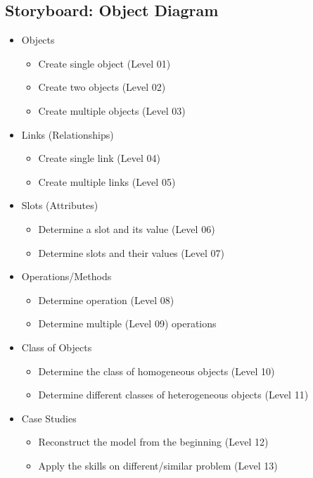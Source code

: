 \documentclass[12pt, a4paper]{report}
\begin{document}
\begin{appendices}
\chapter{Storyboard: Object Diagram}
\label{Storyboards}
\begin{itemize}
\item Objects
	\begin{itemize}
	\item Create single object (Level 01)
	\item Create two objects (Level 02)
	\item Create multiple objects (Level 03)
	\end{itemize}
\item Links (Relationships)
	\begin{itemize}
	\item Create single link (Level 04)
	\item Create multiple links (Level 05)
	\end{itemize}
\item Slots (Attributes)
	\begin{itemize}
	\item Determine a slot and its value (Level 06)
	\item Determine slots and their values (Level 07)
	\end{itemize}
\item Operations/Methods
	\begin{itemize}
	\item Determine operation (Level 08)
	\item Determine multiple (Level 09) operations
	\end{itemize}
\item Class of Objects
	\begin{itemize}
	\item Determine the class of homogeneous objects (Level 10)
	\item Determine different classes of heterogeneous objects (Level 11)
	\end{itemize}
\item Case Studies
	\begin{itemize}
	\item Reconstruct the model from the beginning (Level 12)
	\item Apply the skills on different/similar problem (Level 13)
	\end{itemize}
\end{itemize}


\end{appendices}
\end{document}
